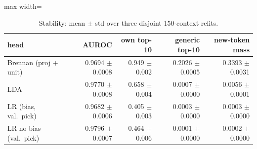 \begin{table}[t]
\centering
\footnotesize
\caption{Stability: mean $\pm$ std over three disjoint 150-context refits.}
\label{tab:bench_stability}
\begin{adjustbox}{max width=\textwidth}
\begin{tabular}{lrrrr}
\toprule
head & AUROC & own top-10 & generic top-10 & new-token mass \\
\midrule
Brennan (proj + unit) & 0.9694 $\pm$ 0.0008 & 0.949 $\pm$ 0.002 & 0.2026 $\pm$ 0.0005 & 0.3393 $\pm$ 0.0031 \\
LDA & 0.9770 $\pm$ 0.0008 & 0.658 $\pm$ 0.004 & 0.0007 $\pm$ 0.0000 & 0.0056 $\pm$ 0.0001 \\
LR (bias, val.\ pick) & 0.9682 $\pm$ 0.0006 & 0.405 $\pm$ 0.003 & 0.0003 $\pm$ 0.0000 & 0.0003 $\pm$ 0.0000 \\
LR no bias (val.\ pick) & 0.9796 $\pm$ 0.0007 & 0.464 $\pm$ 0.006 & 0.0001 $\pm$ 0.0000 & 0.0002 $\pm$ 0.0000 \\
\bottomrule
\end{tabular}
\end{adjustbox}
\end{table}